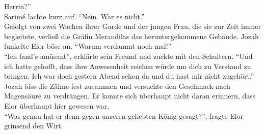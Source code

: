 Herrin?''\\
Sarimé lachte kurz auf. ``Nein. War es nicht.''\\
Gefolgt von zwei Wachen ihrer Garde und der jungen Frau, die sie zur Zeit immer begleitete, verließ 
die Gräfin Merandilas das heruntergekommene Gebäude. Jozah funkelte Elor böse an. ``Warum verdammt 
noch mal!''\\
``Ich fand's amüsant'', erklärte sein Freund und zuckte mit den Schultern. ``Und ich hatte gehofft, 
dass ihre Anwesenheit reichen würde um dich zu Verstand zu bringen. Ich war doch gestern Abend 
schon da und du hast mir nicht zugehört.''\\
Jozah biss die Zähne fest zusammen und versuchte den Geschmack nach Magensäure zu verdrängen. Er 
konnte sich überhaupt nicht daran erinnern, dass Elor überhaupt hier gewesen war.\\
``Was genau hat er denn gegen unseren geliebten König gesagt?'', fragte Elor grinsend den Wirt.\\

